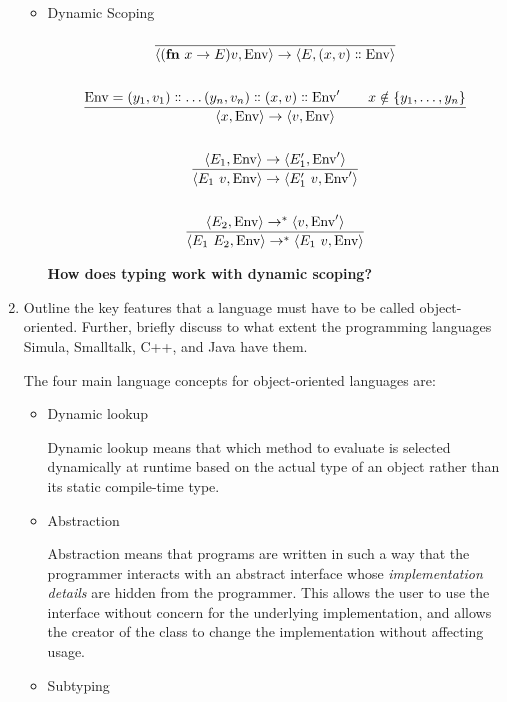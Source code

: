 \documentclass[10pt,\jkfside,a4paper]{article}
\begin{document}
\begin{enumerate}
\begin{itemize}
\item Dynamic Scoping

\begin{gather*}
\dfrac{}{
\langle
(\mathbf{fn}\ x \to E)v, \text{Env}
\rangle
\to
\langle
E, (x, v)\dblcolon\text{Env}
\rangle
}\\\\
\dfrac{
\text{Env} = (y_1, v_1)
\dblcolon \dots (y_n, v_n) \dblcolon (x, v) \dblcolon \text{Env}'
\qquad
x \notin \{y_1, \dots, y_n\}
}{
\langle
x, \text{Env}
\rangle
\to
\langle
v, \text{Env}
\rangle
}\\\\
\dfrac{
\langle
E_1, \text{Env}
\rangle
\to
\langle
E_1', \text{Env}'
\rangle
}{
\langle
E_1\ v, \text{Env}
\rangle
\to
\langle
E_1'\ v, \text{Env}'
\rangle
}\\\\
\dfrac{
\langle
E_2, \text{Env}
\rangle
\to^*
\langle
v, \text{Env}'
\rangle
}{
\langle
E_1\ E_2, \text{Env}
\rangle
\to^*
\langle
E_1\ v, \text{Env}
\rangle
}
\end{gather*}

\textbf{How does typing work with dynamic scoping?}

\end{itemize}

\item Outline the key features that a language must have to be called
object-oriented. Further, briefly discuss to what extent the programming
languages Simula, Smalltalk, C++, and Java have them.

The four main language concepts for object-oriented languages are:
\begin{itemize}

\item Dynamic lookup

Dynamic lookup means that which method to evaluate is selected dynamically
at runtime based on the actual type of an object rather than its static
compile-time type.

\item Abstraction

Abstraction means that programs are written in such a way that the
programmer interacts with an abstract interface whose
\textit{implementation details} are hidden from the programmer. This allows
the user to use the interface without concern for the underlying
implementation, and allows the creator of the class to change the
implementation without affecting usage.

\item Subtyping


\end{itemize}
\end{enumerate}
\end{document}

